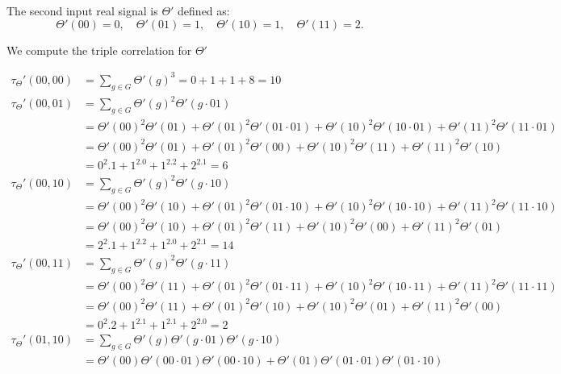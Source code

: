 \normalsize

The second input real signal is $\Theta'$ defined as:
\begin{equation}
    \Theta'(00) = 0, \quad \Theta'(01) = 1, \quad \Theta'(10) = 1, \quad \Theta'(11) = 2.
\end{equation}

We compute the triple correlation for $\Theta'$

\scriptsize
\begin{align*}
    \tau_\Theta'(00, 00)
    &= \sum_{g \in G} \Theta'(g)^3
    = 0+1+1+8
    = 10 \\
    \tau_\Theta'(00, 01)
    &=\sum_{g \in G} \Theta'(g)^2\Theta'(g \cdot 01) \\
    &= \Theta'(00)^2\Theta'(01)
        + \Theta'(01)^2\Theta'(01\cdot 01)
        + \Theta'(10)^2\Theta'(10\cdot 01)
        + \Theta'(11)^2\Theta'(11\cdot 01)\\
    &= \Theta'(00)^2\Theta'(01)
        + \Theta'(01)^2\Theta'(00)
        + \Theta'(10)^2\Theta'(11)
        + \Theta'(11)^2\Theta'(10)\\
    &= 0^2 .1 +1^2.0+1^2.2+2^2.1
    = 6 \\
    \tau_\Theta'(00, 10)
    &=\sum_{g \in G} \Theta'(g)^2\Theta'(g \cdot 10) \\
    &= \Theta'(00)^2\Theta'(10)
        + \Theta'(01)^2\Theta'(01\cdot 10)
        + \Theta'(10)^2\Theta'(10\cdot 10)
        + \Theta'(11)^2\Theta'(11\cdot 10)\\
    &= \Theta'(00)^2\Theta'(10)
        + \Theta'(01)^2\Theta'(11)
        + \Theta'(10)^2\Theta'(00)
        + \Theta'(11)^2\Theta'(01)\\
    &= 2^2 .1 +1^2.2+1^2.0+2^2.1
    = 14 \\
    \tau_\Theta'(00, 11)
    &= \sum_{g \in G} \Theta'(g)^2\Theta'(g \cdot 11) \\
    &= \Theta'(00)^2\Theta'(11)
        + \Theta'(01)^2\Theta'(01\cdot 11)
        + \Theta'(10)^2\Theta'(10\cdot 11)
        + \Theta'(11)^2\Theta'(11\cdot 11)\\
    &= \Theta'(00)^2\Theta'(11)
        + \Theta'(01)^2\Theta'(10)
        + \Theta'(10)^2\Theta'(01)
        + \Theta'(11)^2\Theta'(00)\\
    &= 0^2 .2 +1^2.1+1^2.1+2^2.0 = 2 \\
    \tau_\Theta'(01, 10)
    &= \sum_{g \in G} \Theta'(g)\Theta'(g \cdot 01) \Theta'(g \cdot 10) \\
    &= \Theta'(00)\Theta'(00 \cdot 01) \Theta'(00 \cdot 10)
    + \Theta'(01)\Theta'(01 \cdot 01) \Theta'(01 \cdot 10)

\end{align*}
